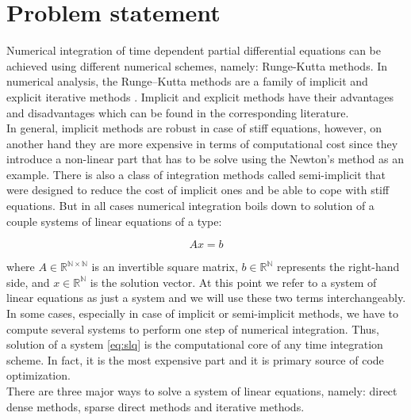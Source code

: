 \section{Problem statement} \label{subseq:problem-statement}


Numerical integration of time dependent partial differential equations can be achieved using different numerical schemes, namely: Runge-Kutta methods. In numerical analysis, the Runge–Kutta methods are a family of implicit and explicit iterative methods \cite{wiki:runge-kutta}. Implicit and explicit methods have their advantages and disadvantages which can be found in the corresponding literature.\\

 In general, implicit methods are robust in case of stiff equations, however, on another hand they are more expensive in terms of computational cost since they introduce a non-linear part that has to be solve using the Newton's method as an example. There is also a class of integration methods called semi-implicit that were designed to reduce the cost of implicit ones and be able to cope with stiff equations. But in all cases numerical integration boils down to solution of a couple systems of linear equations of a type:


\begin{equation} \label{eq:slq}
	Ax = b
\end{equation}


 where $A \in \mathbb{R^{N \times N}}$ is an invertible square matrix, $b \in \mathbb{R^{N}}$ represents the right-hand side, and $x \in \mathbb{R^{N}}$ is the solution vector. At this point we refer to a system of linear equations as just a system and we will use these two terms interchangeably. \\

 
In some cases, especially in case of implicit or semi-implicit methods, we have to compute several systems to perform one step of numerical integration. Thus, solution of a system \ref{eq:slq} is the computational core of any time integration scheme. In fact, it is the most expensive part and it is primary source of code optimization. \\ 


There are three major ways to solve a system of linear equations, namely: direct dense methods, sparse direct methods and iterative methods.\\

